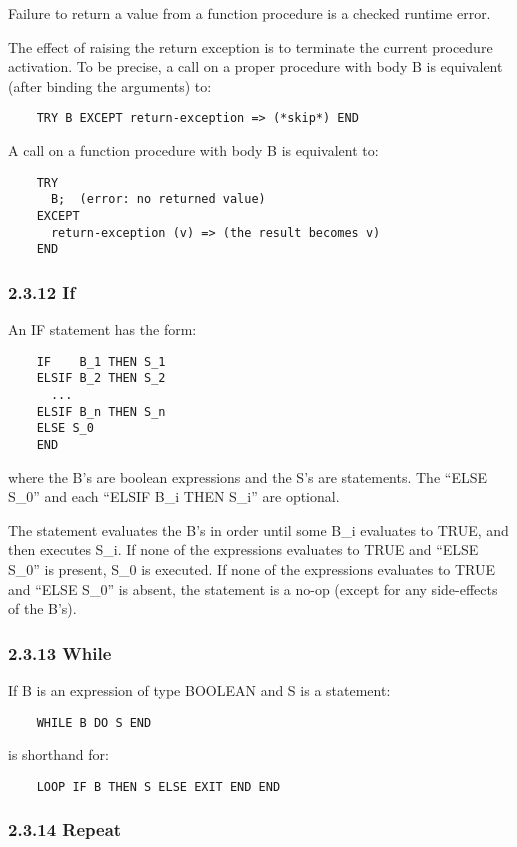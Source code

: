 \documentclass[10pt]{article}
\begin{document}
Failure to return a value from a function procedure is a checked runtime
error.

The effect of raising the return exception is to terminate the current
procedure activation.  To be precise, a call on a proper procedure with body B
is equivalent (after binding the arguments) to:
\begin{verbatim}
    TRY B EXCEPT return-exception => (*skip*) END
\end{verbatim}
A call on a function procedure with body B is equivalent to:
\begin{verbatim}
    TRY
      B;  (error: no returned value)
    EXCEPT
      return-exception (v) => (the result becomes v)
    END
\end{verbatim}

\subsubsection*{2.3.12 If}

An IF statement has the form:
\begin{verbatim}
    IF    B_1 THEN S_1
    ELSIF B_2 THEN S_2
      ...
    ELSIF B_n THEN S_n
    ELSE S_0
    END
\end{verbatim}

where the B's are boolean expressions and the S's are statements.  The ``ELSE
S\_0'' and each ``ELSIF B\_i THEN S\_i'' are optional.

The statement evaluates the B's in order until some B\_i evaluates to TRUE,
and then executes S\_i.  If none of the expressions evaluates to TRUE and
``ELSE S\_0'' is present, S\_0 is executed.  If none of the expressions
evaluates to TRUE and ``ELSE S\_0'' is absent, the statement is a no-op
(except for any side-effects of the B's).

\subsubsection*{2.3.13 While}

If B is an expression of type BOOLEAN and S is a statement:
\begin{verbatim}
    WHILE B DO S END
\end{verbatim}
is shorthand for:
\begin{verbatim}
    LOOP IF B THEN S ELSE EXIT END END
\end{verbatim}

\subsubsection*{2.3.14 Repeat}
\end{document}
